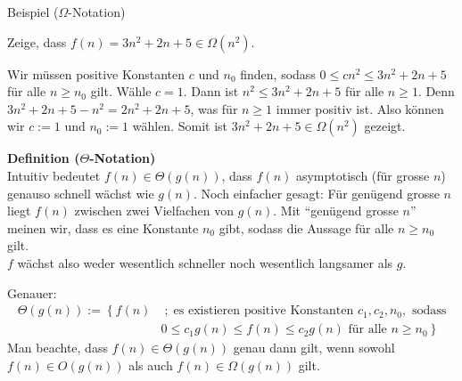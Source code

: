 \begin{frame}{Beispiel ($\Omega$-Notation)}
	\begin{myexercise}
		Zeige, dass $f(n) = 3n^2 + 2n + 5 \in \Omega(n^2)$.
	\end{myexercise}
	\begin{myanswer}
		Wir müssen positive Konstanten $c$ und $n_0$ finden, sodass $0 \leq cn^2 \leq 3n^2 + 2n + 5$ für alle $n \geq n_0$ gilt.
		Wähle $c=1$. Dann ist $n^2 \leq 3n^2 + 2n + 5$ für alle $n \geq 1$.
		Denn $3n^2 + 2n + 5 - n^2 = 2n^2 + 2n + 5$, was für $n \geq 1$ immer positiv ist.
		Also können wir $c:=1$ und $n_0:=1$ wählen.
		Somit ist $3n^2 + 2n + 5 \in \Omega(n^2)$ gezeigt.
	\end{myanswer}
\end{frame}

\begin{frame}
\textbf{Definition ($\Theta$-Notation)}\\
Intuitiv bedeutet $f(n)\in\Theta(g(n))$, dass $f(n)$ asymptotisch (für grosse $n$) genauso schnell wächst wie $g(n)$. Noch einfacher gesagt: Für genügend grosse $n$ liegt $f(n)$ zwischen zwei Vielfachen von $g(n)$. Mit \enquote{genügend grosse $n$} meinen wir, dass es eine Konstante $n_0$ gibt, sodass die Aussage für alle $n\geq n_0$ gilt.\\

\vspace{\baselineskip}
$f$ wächst also weder wesentlich schneller noch wesentlich langsamer als $g$.

\vspace{\baselineskip}
Genauer:
\begin{align}\label{eq:Theta}
    \Theta(g(n)) := \left\{ f(n) \right. &  \; ; \; \text{es existieren positive Konstanten } c_1, c_2, n_0, \text{ sodass} \nonumber \\
    & \left. 0 \leq c_1 g(n) \leq f(n) \leq c_2 g(n) \text{ für alle } n \geq n_0 \right\}
\end{align}
Man beachte, dass $f(n)\in\Theta(g(n))$ genau dann gilt, wenn sowohl $f(n)\in O(g(n))$ als auch $f(n)\in\Omega(g(n))$ gilt.
\end{frame}

